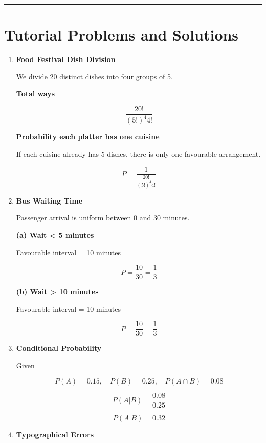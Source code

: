 \documentclass[11pt]{article}
\begin{document}
\hrule
\vspace{0.5cm}

\section*{Tutorial Problems and Solutions}

\begin{enumerate}[label=\textbf{Question \arabic*:}]

\item \textbf{Food Festival Dish Division}

We divide 20 distinct dishes into four groups of 5.

\textbf{Total ways}

\[
\frac{20!}{(5!)^4 4!}
\]

\textbf{Probability each platter has one cuisine}

If each cuisine already has 5 dishes, there is only one favourable arrangement.

\[
P = \frac{1}{\frac{20!}{(5!)^4 4!}}
\]

\newpage

\item \textbf{Bus Waiting Time}

Passenger arrival is uniform between 0 and 30 minutes.

\textbf{(a) Wait < 5 minutes}

Favourable interval = 10 minutes

\[
P = \frac{10}{30} = \frac{1}{3}
\]

\textbf{(b) Wait > 10 minutes}

Favourable interval = 10 minutes

\[
P = \frac{10}{30} = \frac{1}{3}
\]

\newpage

\item \textbf{Conditional Probability}

Given

\[
P(A)=0.15, \quad P(B)=0.25, \quad P(A\cap B)=0.08
\]

\[
P(A|B)=\frac{0.08}{0.25}
\]

\[
P(A|B)=0.32
\]

\newpage

\item \textbf{Typographical Errors}


\end{enumerate}
\end{document}
